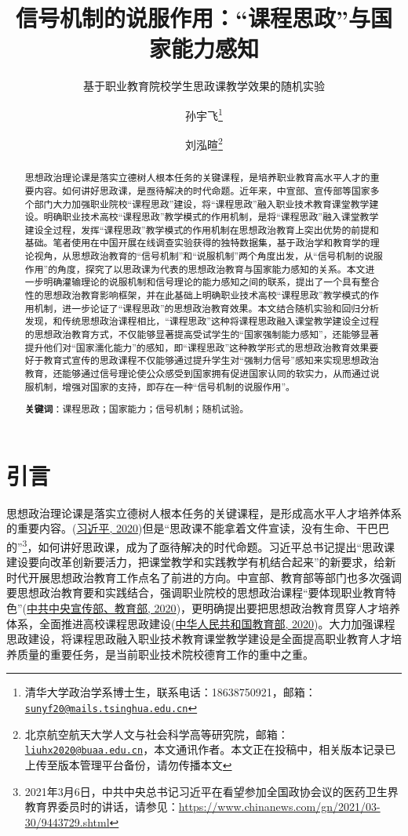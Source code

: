 \documentclass[
  12pt,
]{ctexart}
\title{信号机制的说服作用：``课程思政''与国家能力感知}
\subtitle{基于职业教育院校学生思政课教学效果的随机实验}
\author{孙宇飞\footnote{清华大学政治学系博士生，联系电话：18638750921，邮箱：\href{mailto:sunyf20@mails.tsinghua.edu.cn}{\nolinkurl{sunyf20@mails.tsinghua.edu.cn}}} \and 刘泓暄\footnote{北京航空航天大学人文与社会科学高等研究院，邮箱：\href{mailto:liuhx2020@buaa.edu.cn}{\nolinkurl{liuhx2020@buaa.edu.cn}}，本文通讯作者。本文正在投稿中，相关版本记录已上传至版本管理平台备份，请勿传播本文}}
\date{}
\begin{document}
\maketitle
\begin{abstract}
思想政治理论课是落实立德树人根本任务的关键课程，是培养职业教育高水平人才的重要内容。如何讲好思政课，是亟待解决的时代命题。近年来，中宣部、宣传部等国家多个部门大力加强职业院校``课程思政''建设，将``课程思政''融入职业技术教育课堂教学建设。明确职业技术高校``课程思政''教学模式的作用机制，是将``课程思政''融入课堂教学建设全过程，发挥``课程思政''教学模式的作用机制在思想政治教育上突出优势的前提和基础。笔者使用在中国开展在线调查实验获得的独特数据集，基于政治学和教育学的理论视角，从思想政治教育的``信号机制''和``说服机制''两个角度出发，从``信号机制的说服作用''的角度，探究了以思政课为代表的思想政治教育与国家能力感知的关系。本文进一步明确灌输理论的说服机制和信号理论的能力感知之间的联系，提出了一个具有整合性的思想政治教育影响框架，并在此基础上明确职业技术高校``课程思政''教学模式的作用机制，进一步论证了``课程思政''的思想政治教育效果。本文结合随机实验和回归分析发现，和传统思想政治课程相比，``课程思政''这种将课程思政融入课堂教学建设全过程的思想政治教育方式，不仅能够显著提高受试学生的``国家强制能力感知''，还能够显著提升他们对``国家濡化能力''的感知，即``课程思政''这种教学形式的思想政治教育效果要好于教育式宣传的思政课程不仅能够通过提升学生对``强制力信号''感知来实现思想政治教育，还能够通过信号理论使公众感受到国家拥有促进国家认同的软实力，从而通过说服机制，增强对国家的支持，即存在一种``信号机制的说服作用''。

\textbf{关键词}：课程思政；国家能力；信号机制；随机试验。
\end{abstract}

\newpage

\hypertarget{ux5f15ux8a00}{%
\section{引言}\label{ux5f15ux8a00}}

思想政治理论课是落实立德树人根本任务的关键课程，是形成高水平人才培养体系的重要内容。(\protect\hyperlink{ref-XiJinPing2020}{习近平, 2020})但是``思政课不能拿着文件宣读，没有生命、干巴巴的''\footnote{2021年3月6日，中共中央总书记习近平在看望参加全国政协会议的医药卫生界教育界委员时的讲话，请参见：\url{https://www.chinanews.com/gn/2021/03-30/9443729.shtml}}，如何讲好思政课，成为了亟待解决的时代命题。习近平总书记提出``思政课建设要向改革创新要活力，把课堂教学和实践教学有机结合起来''的新要求，给新时代开展思想政治教育工作点名了前进的方向。中宣部、教育部等部门也多次强调要思想政治教育要和实践结合，强调职业院校的思想政治课程``要体现职业教育特色''(\protect\hyperlink{ref-ZhongGongZhongYangXuanChuanBuJiaoYuBu2020}{中共中央宣传部、教育部, 2020})，更明确提出要把思想政治教育贯穿人才培养体系，全面推进高校课程思政建设(\protect\hyperlink{ref-ZhongHuaRenMinGongHeGuoJiaoYuBu2020}{中华人民共和国教育部, 2020})。大力加强课程思政建设，将课程思政融入职业技术教育课堂教学建设是全面提高职业教育人才培养质量的重要任务，是当前职业技术院校德育工作的重中之重。
\end{document}

